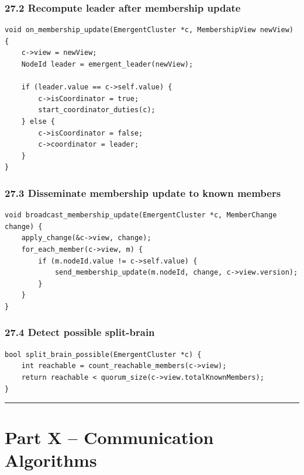 \documentclass[10pt,letterpaper]{article}
\begin{document}
\subsubsection*{27.2 Recompute leader after membership update}

\begin{verbatim}
void on_membership_update(EmergentCluster *c, MembershipView newView) {
    c->view = newView;
    NodeId leader = emergent_leader(newView);

    if (leader.value == c->self.value) {
        c->isCoordinator = true;
        start_coordinator_duties(c);
    } else {
        c->isCoordinator = false;
        c->coordinator = leader;
    }
}
\end{verbatim}

\subsubsection*{27.3 Disseminate membership update to known members}

\begin{verbatim}
void broadcast_membership_update(EmergentCluster *c, MemberChange change) {
    apply_change(&c->view, change);
    for_each_member(c->view, m) {
        if (m.nodeId.value != c->self.value) {
            send_membership_update(m.nodeId, change, c->view.version);
        }
    }
}
\end{verbatim}

\subsubsection*{27.4 Detect possible split-brain}

\begin{verbatim}
bool split_brain_possible(EmergentCluster *c) {
    int reachable = count_reachable_members(c->view);
    return reachable < quorum_size(c->view.totalKnownMembers);
}
\end{verbatim}

\medskip\hrule\medskip

\clearpage
\section*{Part X -- Communication Algorithms}
\end{document}
